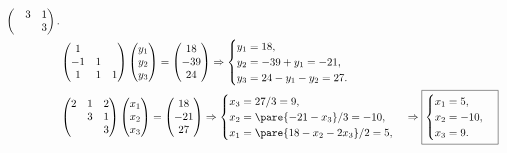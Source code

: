 \documentclass[hidelinks]{ctexart}
\begin{document}
\begin{align*}
\begin{pmatrix}
        & 3 & 1 \\
        & & 3
    \end{pmatrix}. \\
\hspace{-3em} & \begin{pmatrix}
        1 & & \\
        -1 & 1 & \\
        1 & 1 & 1
    \end{pmatrix}\begin{pmatrix}
        y_1 \\ y_2 \\ y_3
    \end{pmatrix} = \begin{pmatrix}
        18 \\ -39 \\ 24
    \end{pmatrix} \Rightarrow \begin{cases}
        y_1 = 18, \\
        y_2 = -39 + y_1 = -21, \\
        y_3 = 24 - y_1 - y_2 = 27.
    \end{cases} \\
\hspace{-3em} & \begin{pmatrix}
        2 & 1 & 2 \\
         & 3 & 1 \\
         &  & 3
    \end{pmatrix}\begin{pmatrix}
        x_1 \\ x_2 \\ x_3
    \end{pmatrix} = \begin{pmatrix}
        18 \\ -21 \\ 27
    \end{pmatrix} \Rightarrow \begin{cases}
        x_3 = 27/3 = 9, \\
        x_2 = \pare{-21 - x_3}/3 = -10, \\
        x_1 = \pare{18 - x_2 - 2x_3}/2 = 5,
    \end{cases} \Rightarrow \boxed{\begin{cases}
        x_1 = 5, \\
        x_2 = -10, \\
        x_3 = 9.
    \end{cases}}
\end{align*}
\end{document}
